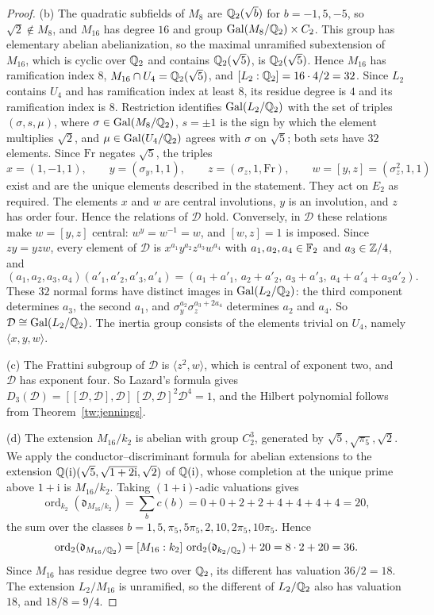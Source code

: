 \begin{proof}
(b) The quadratic subfields of $M_8$ are $\mathbb Q_2(\sqrt b)$ for $b=-1,5,-5$, so
$\sqrt2\notin M_8$, and $M_{16}$ has degree $16$ and group
$\operatorname{Gal}(M_8/\mathbb Q_2)\times C_2$. This group has elementary abelian
abelianization, so the maximal unramified subextension of $M_{16}$, which is
cyclic over $\mathbb Q_2$ and contains $\mathbb Q_2(\sqrt5)$, is $\mathbb Q_2(\sqrt5)$. Hence
$M_{16}$ has ramification index $8$, $M_{16}\cap U_4=\mathbb Q_2(\sqrt5)$, and
$[L_2:\mathbb Q_2]=16\cdot4/2=32$. Since $L_2$ contains $U_4$ and has ramification
index at least $8$, its residue degree is $4$ and its ramification index is
$8$. Restriction identifies $\operatorname{Gal}(L_2/\mathbb Q_2)$ with the set of triples
$(\sigma,s,\mu)$, where $\sigma\in\operatorname{Gal}(M_8/\mathbb Q_2)$, $s=\pm1$ is
the sign by which the element multiplies $\sqrt2$, and $\mu\in\operatorname{Gal}(U_4/\mathbb Q_2)$
agrees with $\sigma$ on $\sqrt5$; both sets have $32$ elements. Since $\mathrm{Fr}$
negates $\sqrt5$, the triples
\[
 x=(1,-1,1),\qquad y=(\sigma_y,1,1),\qquad z=(\sigma_z,1,\mathrm{Fr}),\qquad
 w=[y,z]=(\sigma_z^2,1,1)
\]
exist and are the unique elements described in the statement. They act on
$E_2$ as required. The elements $x$ and $w$ are central involutions, $y$ is
an involution, and $z$ has order four. Hence the relations of $\mathcal D$ hold. Conversely, in
$\mathcal D$ these relations make $w=[y,z]$ central: $w^y=w^{-1}=w$, and $[w,z]=1$ is
imposed. Since $zy=yzw$, every element of $\mathcal D$ is
$x^{a_1}y^{a_2}z^{a_3}w^{a_4}$ with $a_1,a_2,a_4\in\mathbb F_2$ and
$a_3\in\mathbb Z/4$, and
\[
 (a_1,a_2,a_3,a_4)(a'_1,a'_2,a'_3,a'_4)
 =(a_1+a'_1,\,a_2+a'_2,\,a_3+a'_3,\,a_4+a'_4+a_3a'_2).
\]
These $32$ normal forms have distinct images in $\operatorname{Gal}(L_2/\mathbb Q_2)$: the third
component determines $a_3$, the second $a_1$, and
$\sigma_y^{a_2}\sigma_z^{a_3+2a_4}$ determines $a_2$ and $a_4$. So
$\mathcal D\cong\operatorname{Gal}(L_2/\mathbb Q_2)$. The inertia group consists of the elements trivial
on $U_4$, namely $\langle x,y,w\rangle$.

(c) The Frattini subgroup of $\mathcal D$ is $\langle z^2,w\rangle$, which is central
of exponent two, and $\mathcal D$ has exponent four. So Lazard's formula gives
$D_3(\mathcal D)=[[\mathcal D,\mathcal D],\mathcal D]\,[\mathcal D,\mathcal D]^2\mathcal D^4=1$, and the Hilbert polynomial follows from
Theorem~\ref{tw:jennings}.

(d) The extension $M_{16}/k_2$ is abelian with group $C_2^3$, generated by
$\sqrt5,\sqrt{\pi_5},\sqrt2$. We apply the conductor--discriminant formula for
abelian extensions \cite[Chapter~V, Theorem~3.27]{MilneCFT} to the extension
$\mathbb Q(\mathrm i)(\sqrt5,\sqrt{1+2\mathrm i},\sqrt2)$ of $\mathbb Q(\mathrm i)$, whose completion at the unique
prime above $1+\mathrm i$ is $M_{16}/k_2$. Taking $(1+\mathrm i)$-adic valuations gives
\[
 \operatorname{ord}_{k_2}(\mathfrak d_{M_{16}/k_2})=\sum_bc(b)=0+0+2+2+4+4+4+4=20,
\]
the sum over the classes $b=1,5,\pi_5,5\pi_5,2,10,2\pi_5,10\pi_5$. Hence
\[
 \operatorname{ord}_2(\mathfrak d_{M_{16}/\mathbb Q_2})
 =[M_{16}:k_2]\,\operatorname{ord}_2(\mathfrak d_{k_2/\mathbb Q_2})+20=8\cdot2+20=36.
\]
Since $M_{16}$ has residue degree two over $\mathbb Q_2$, its different has
valuation $36/2=18$. The extension $L_2/M_{16}$ is unramified, so the
different of $L_2/\mathbb Q_2$ also has valuation $18$, and $18/8=9/4$.
\end{proof}

